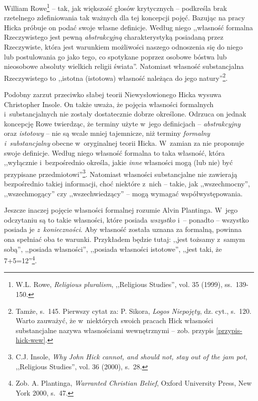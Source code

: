 William Rowe\footnote{W.L. Rowe, \textit{Religious pluralism}, ,,Religious Studies'', vol. 35 (1999), ss.~139-150.} -- tak, jak większość głosów krytycznych -- podkreśla brak rzetelnego zdefiniowania tak ważnych dla tej koncepcji pojęć. Bazując na pracy Hicka próbuje on podać swoje własne definicje. Według niego ,,własność formalna Rzeczywistego jest pewną \textit{abstrakcyjną} charakterystyką posiadaną przez Rzeczywiste, która jest warunkiem możliwości naszego odnoszenia się do niego lub postulowania go jako tego, co spotykane poprzez osobowe bóstwa lub nieosobowe absoluty wielkich religii świata''. Natomiast własność substancjalna Rzeczywistego to ,,istotna (istotowa) własność należąca do jego natury''\footnote{Tamże, s.~145. Pierwszy cytat za: P. Sikora, \textit{Logos Niepojęty}, dz. cyt., s.~120. Warto zauważyć, że w~niektórych swoich pracach Hick własności substancjalne nazywa własnościami wewnętrznymi -- zob. przypis \ref{przypis-hick-wew}.}.

Podobny zarzut przeciwko słabej teorii Niewysłowionego Hicka wysuwa Christopher Insole. On także uważa, że pojęcia własności formalnych i~substancjalnych nie zostały dostatecznie dobrze określone. Odrzuca on jednak koncepcję Rowe twierdząc, że terminy użyte w~jego definicjach -- \textit{abstrakcyjny} oraz \textit{istotowy} -- nie są wcale mniej tajemnicze, niż terminy \textit{formalny i~substancjalny} obecne w~oryginalnej teorii Hicka. W~zamian za nie proponuje swoje definicje. Według niego własność formalna to taka własność, która ,,wyłącznie i~bezpośrednio określa, jakie \textit{inne} własności mogą (lub nie) być przypisane przedmiotowi''\footnote{C.J. Insole, \textit{Why John Hick cannot, and should not, stay out of the jam pot}, ,,Religious Studies'', vol. 36 (2000), s.~28.}. Natomiast własności substancjalne nie zawierają bezpośrednio takiej informacji, choć niektóre z~nich -- takie, jak ,,wszechmocny'', ,,wszechmogący'' czy ,,wszechwiedzący'' -- mogą wymagać współwystępowania.

Jeszcze inaczej pojęcie własności formalnej rozumie Alvin Plantinga. W~jego odczytaniu są to takie własności, które posiada \textit{wszystko} i~-- ponadto -- wszystko posiada je \textit{z~konieczności}. Aby własność została uznana za formalną, powinna ona spełniać oba te warunki. Przykładem będzie tutaj: ,,jest tożsamy z~samym sobą'', ,,posiada własności'', ,,posiada własności istotowe'', ,,jest taki, że 7+5=12''\footnote{Zob. A. Plantinga, \textit{Warranted Christian Belief}, Oxford University Press, New York 2000, s.~47.}.


